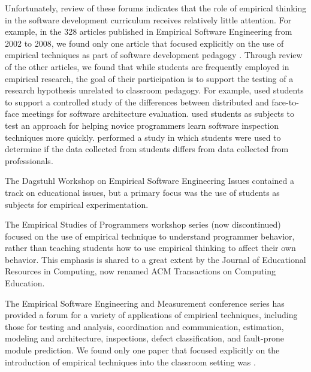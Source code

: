 Unfortunately, review of these forums indicates that the role of empirical
thinking in the software development curriculum receives relatively little
attention.  For example, in the 328 articles published in Empirical
Software Engineering from 2002 to 2008, we found only one article that
focused explicitly on the use of empirical techniques as part of software
development pedagogy \citep{Pfahl03}.  Through review of the other
articles, we found that while students are frequently employed in empirical
research, the goal of their participation is to support the testing of a
research hypothesis unrelated to classroom pedagogy.  For example,
\cite{Babar08} used students to support a controlled study of the
differences between distributed and face-to-face meetings for software
architecture evaluation.  \cite{Carver06} used students as subjects to test
an approach for helping novice programmers learn software inspection
techniques more quickly.  \cite{Host00} performed a study in which students
were used to determine if the data collected from students differs from
data collected from professionals.

The Dagstuhl Workshop on Empirical Software Engineering Issues
\citep{Basili06} contained a track on educational issues, but a primary
focus was the use of students as subjects for empirical experimentation.

The Empirical Studies of Programmers workshop series (now discontinued)
focused on the use of empirical technique to understand programmer
behavior, rather than teaching students how to use empirical thinking to
affect their own behavior.  This emphasis is shared to a great extent by
the Journal of Educational Resources in Computing, now renamed ACM
Transactions on Computing Education.

The Empirical Software Engineering and Measurement conference series has
provided a forum for a variety of applications of empirical techniques,
including those for testing and analysis, coordination and communication,
estimation, modeling and architecture, inspections, defect classification,
and fault-prone module prediction.  We found only one paper that focused
explicitly on the introduction of empirical techniques into the classroom
setting was \citep{csdl2-03-12}.

